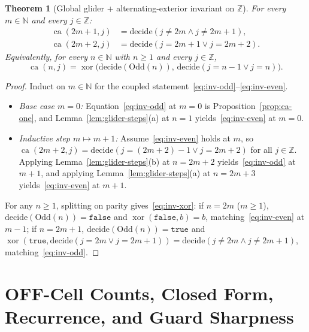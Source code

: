 \documentclass[11pt]{article}
\newtheorem{theorem}{Theorem}[section]
\theoremstyle{definition}
\newcommand{\N}{\mathbb{N}}
\newcommand{\Z}{\mathbb{Z}}
\newcommand{\ca}{\operatorname{ca}}
\begin{document}
\begin{theorem}[Global glider + alternating-exterior invariant on $\Z$]
\label{thm:global-inv}
For every $m \in \N$ and every $j \in \Z$:
\begin{align}
\ca(2m + 1, j) &= \mathrm{decide}(j \ne 2m \land j \ne 2m + 1), \label{eq:inv-odd}\\
\ca(2m + 2, j) &= \mathrm{decide}(j = 2m + 1 \lor j = 2m + 2). \label{eq:inv-even}
\end{align}
Equivalently, for every $n \in \N$ with $n \ge 1$ and every $j \in \Z$,
\begin{equation}
\label{eq:inv-xor}
\ca(n, j) = \operatorname{xor}\bigl(\mathrm{decide}(\mathrm{Odd}(n)),\, \mathrm{decide}(j = n - 1 \lor j = n)\bigr).
\end{equation}
\end{theorem}

\begin{proof}
Induct on $m \in \N$ for the coupled statement~\eqref{eq:inv-odd}--\eqref{eq:inv-even}.
\begin{itemize}
\item \emph{Base case $m = 0$:} Equation~\eqref{eq:inv-odd} at $m = 0$ is Proposition~\ref{prop:ca-one}, and Lemma~\ref{lem:glider-steps}(a) at $n = 1$ yields~\eqref{eq:inv-even} at $m = 0$.
\item \emph{Inductive step $m \mapsto m + 1$:} Assume~\eqref{eq:inv-even} holds at $m$, so $\ca(2m + 2, j) = \mathrm{decide}(j = (2m + 2) - 1 \lor j = 2m + 2)$ for all $j \in \Z$. Applying Lemma~\ref{lem:glider-steps}(b) at $n = 2m + 2$ yields~\eqref{eq:inv-odd} at $m + 1$, and applying Lemma~\ref{lem:glider-steps}(a) at $n = 2m + 3$ yields~\eqref{eq:inv-even} at $m + 1$.
\end{itemize}
For any $n \ge 1$, splitting on parity gives~\eqref{eq:inv-xor}: if $n = 2m$ ($m \ge 1$), $\mathrm{decide}(\mathrm{Odd}(n)) = \mathtt{false}$ and $\operatorname{xor}(\mathtt{false}, b) = b$, matching~\eqref{eq:inv-even} at $m - 1$; if $n = 2m + 1$, $\mathrm{decide}(\mathrm{Odd}(n)) = \mathtt{true}$ and $\operatorname{xor}(\mathtt{true}, \mathrm{decide}(j = 2m \lor j = 2m + 1)) = \mathrm{decide}(j \ne 2m \land j \ne 2m + 1)$, matching~\eqref{eq:inv-odd}.
\end{proof}

\section{OFF-Cell Counts, Closed Form, Recurrence, and Guard Sharpness}
\end{document}
